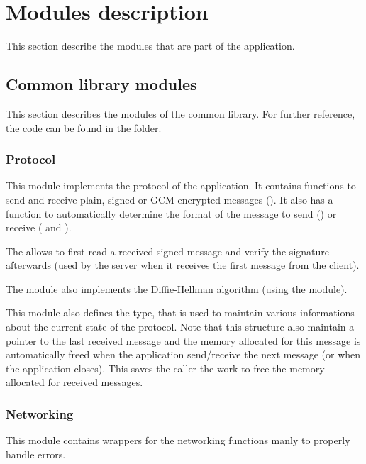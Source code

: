 \section{Modules description}\label{sec:modules}

This section describe the modules that are part of the application.


\subsection{Common library modules}\label{subsec:commonmod}

This section describes the modules of the common library. For further reference,
the code can be found in the  folder.

\subsubsection{Protocol}

This module implements the protocol of the application. It contains functions to
send and receive plain, signed or GCM encrypted messages
(). It also has a function to automatically
determine the format of the message to send () or receive
( and ).

The  allows to first read a received signed
message and verify the signature afterwards (used by the server when it receives
the first message from the client).

The module also implements the Diffie-Hellman algorithm (using the 
module).

This module also defines the  type, that is used to maintain
various informations about the current state of the protocol. Note that this
structure also maintain a pointer to the last received message and the memory
allocated for this message is automatically freed when the application
send/receive the next message (or when the application closes). This saves the
caller the work to free the memory allocated for received messages.

\subsubsection{Networking}

This module contains wrappers for the networking functions  manly to properly handle
errors.

